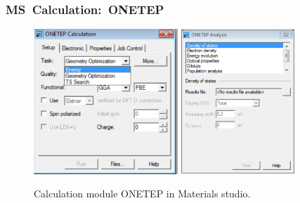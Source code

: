 \frame
{
	\frametitle{\textrm{MS~Calculation:~ONETEP}}
\begin{figure}[h!]
\centering
\vspace*{-0.12in}
\includegraphics[height=2.15in,width=2.14in,viewport=0 0 646 650,clip]{Figures/MS-Caluculator_ONETEP-parameter.png}
\includegraphics[height=2.15in,width=1.68in,viewport=0 0 605 776,clip]{Figures/MS-Caluculator_ONETEP-analysis.png}
\caption{\tiny \textrm{Calculation module ONETEP in Materials studio.}}%
\label{MS-Calculation_ONETEP}
\end{figure}
}

